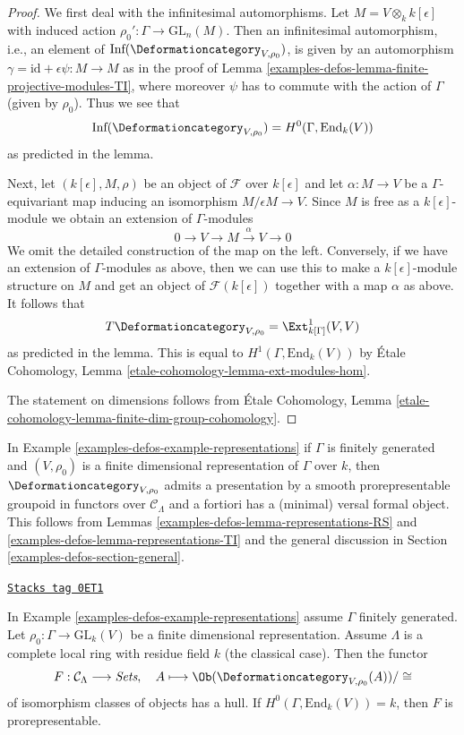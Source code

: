 \begin{proof}
We first deal with the infinitesimal automorphisms.
Let $M = V \otimes_k k[\epsilon]$ with induced action
$\rho_0' : \Gamma \to \text{GL}_n(M)$.
Then an infinitesimal automorphism, i.e., an element of
$\text{Inf}(\Deformationcategory_{V, \rho_0})$,
is given by an automorphism
$\gamma = \text{id} + \epsilon \psi : M \to M$
as in the proof of Lemma \ref{examples-defos-lemma-finite-projective-modules-TI},
where moreover $\psi$ has to commute
with the action of $\Gamma$ (given by $\rho_0$).
Thus we see that
$$
\text{Inf}(\Deformationcategory_{V, \rho_0}) = H^0(\Gamma, \text{End}_k(V))
$$
as predicted in the lemma.

\medskip\noindent
Next, let $(k[\epsilon], M, \rho)$ be an object of $\mathcal{F}$
over $k[\epsilon]$ and let $\alpha : M \to V$ be a $\Gamma$-equivariant map
inducing an isomorphism $M/\epsilon M \to V$.
Since $M$ is free as a $k[\epsilon]$-module we obtain
an extension of $\Gamma$-modules
$$
0 \to V \to M \xrightarrow{\alpha} V \to 0
$$
We omit the detailed construction of the map on the left.
Conversely, if we have an extension of $\Gamma$-modules as
above, then we can use this to make a $k[\epsilon]$-module
structure on $M$ and get an object of $\mathcal{F}(k[\epsilon])$
together with a map $\alpha$ as above.
It follows that
$$
T\Deformationcategory_{V, \rho_0} = \Ext^1_{k[\Gamma]}(V, V)
$$
as predicted in the lemma. This is equal to
$H^1(\Gamma, \text{End}_k(V))$ by
\'Etale Cohomology, Lemma \ref{etale-cohomology-lemma-ext-modules-hom}.

\medskip\noindent
The statement on dimensions follows from
\'Etale Cohomology, Lemma
\ref{etale-cohomology-lemma-finite-dim-group-cohomology}.
\end{proof}

In Example \ref{examples-defos-example-representations} if $\Gamma$ is finitely generated
and $(V, \rho_0)$ is a finite dimensional representation of $\Gamma$
over $k$, then $\Deformationcategory_{V, \rho_0}$
admits a presentation by a smooth prorepresentable groupoid in functors
over $\mathcal{C}_\Lambda$
and a fortiori has a (minimal) versal formal object. This follows
from Lemmas \ref{examples-defos-lemma-representations-RS} and \ref{examples-defos-lemma-representations-TI}
and the general discussion in Section \ref{examples-defos-section-general}.

\begin{lemma}
\label{examples-defos-lemma-representations-hull}
\href{https://stacks.math.columbia.edu/tag/0ET1}{\texttt{Stacks tag 0ET1}}

In Example \ref{examples-defos-example-representations} assume $\Gamma$ finitely generated.
Let $\rho_0 : \Gamma \to \text{GL}_k(V)$ be a finite dimensional representation.
Assume $\Lambda$ is a complete local ring with residue field $k$
(the classical case). Then the functor
$$
F : \mathcal{C}_\Lambda \longrightarrow \textit{Sets},\quad
A \longmapsto \Ob(\Deformationcategory_{V, \rho_0}(A))/\cong
$$
of isomorphism classes of objects has a hull. If
$H^0(\Gamma, \text{End}_k(V)) = k$, then $F$ is
prorepresentable.
\end{lemma}

